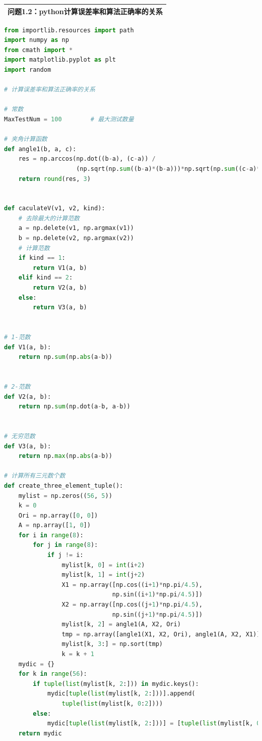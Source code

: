 \documentclass{my_paper}
\begin{document}
\begin{table}[htbp]
    \centering
    \begin{tabular}{|p{14.0cm}|}
    \hline
    \textbf{问题1.2：python计算误差率和算法正确率的关系} \\ %
    \hline
    \end{tabular}
\end{table}

\begin{lstlisting}[language=Python]
from importlib.resources import path
import numpy as np
from cmath import *
import matplotlib.pyplot as plt
import random

# 计算误差率和算法正确率的关系

# 常数
MaxTestNum = 100        # 最大测试数量

# 夹角计算函数
def angle1(b, a, c):
    res = np.arccos(np.dot((b-a), (c-a)) /
                    (np.sqrt(np.sum((b-a)*(b-a)))*np.sqrt(np.sum((c-a)*(c-a)))))
    return round(res, 3)


def caculateV(v1, v2, kind):
    # 去除最大的计算范数
    a = np.delete(v1, np.argmax(v1))
    b = np.delete(v2, np.argmax(v2))
    # 计算范数
    if kind == 1: 
        return V1(a, b)
    elif kind == 2:
        return V2(a, b)
    else:
        return V3(a, b)


# 1-范数
def V1(a, b):
    return np.sum(np.abs(a-b))


# 2-范数
def V2(a, b):
    return np.sum(np.dot(a-b, a-b))


# 无穷范数
def V3(a, b):
    return np.max(np.abs(a-b))

# 计算所有三元数个数
def create_three_element_tuple():
    mylist = np.zeros((56, 5))
    k = 0
    Ori = np.array([0, 0])
    A = np.array([1, 0])
    for i in range(8):
        for j in range(8):
            if j != i:
                mylist[k, 0] = int(i+2)
                mylist[k, 1] = int(j+2)
                X1 = np.array([np.cos((i+1)*np.pi/4.5),
                              np.sin((i+1)*np.pi/4.5)])
                X2 = np.array([np.cos((j+1)*np.pi/4.5),
                              np.sin((j+1)*np.pi/4.5)])
                mylist[k, 2] = angle1(A, X2, Ori)
                tmp = np.array([angle1(X1, X2, Ori), angle1(A, X2, X1)])
                mylist[k, 3:] = np.sort(tmp)
                k = k + 1
    mydic = {}
    for k in range(56):
        if tuple(list(mylist[k, 2:])) in mydic.keys():
            mydic[tuple(list(mylist[k, 2:]))].append(
                tuple(list(mylist[k, 0:2])))
        else:
            mydic[tuple(list(mylist[k, 2:]))] = [tuple(list(mylist[k, 0:2]))]
    return mydic


\end{lstlisting}
\end{document}
